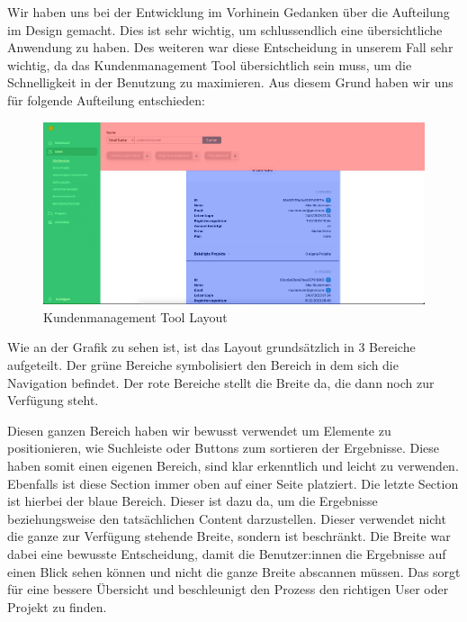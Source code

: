 Wir haben uns bei der Entwicklung im Vorhinein Gedanken über die Aufteilung im Design gemacht. Dies ist sehr wichtig, um schlussendlich eine übersichtliche Anwendung zu haben. Des weiteren war diese Entscheidung in unserem Fall sehr wichtig, da das Kundenmanagement Tool übersichtlich sein muss, um die Schnelligkeit in der Benutzung zu maximieren.
Aus diesem Grund haben wir uns für folgende Aufteilung entschieden:

\begin{figure}[h!]
    \centering
    \includegraphics[width=1\textwidth]{pics/planfred-grids.png}
    \caption{Kundenmanagement Tool Layout}
    \label{fig:mesh1}
\end{figure}

Wie an der Grafik zu sehen ist, ist das Layout grundsätzlich in 3 Bereiche aufgeteilt. Der grüne Bereiche symbolisiert den Bereich in dem sich die Navigation befindet. Der rote Bereiche stellt die Breite da, die dann noch zur Verfügung steht.

Diesen ganzen Bereich haben wir bewusst verwendet um Elemente zu positionieren, wie Suchleiste oder Buttons zum sortieren der Ergebnisse. Diese haben somit einen eigenen Bereich, sind klar erkenntlich und leicht zu verwenden. Ebenfalls ist diese Section immer oben auf einer Seite platziert.
\newpage
Die letzte Section ist hierbei der blaue Bereich. Dieser ist dazu da, um die Ergebnisse beziehungsweise den tatsächlichen Content darzustellen. Dieser verwendet nicht die ganze zur Verfügung stehende Breite, sondern ist beschränkt. Die Breite war dabei eine bewusste Entscheidung, damit die Benutzer:innen die Ergebnisse auf einen Blick sehen können und nicht die ganze Breite abscannen müssen. Das sorgt für eine bessere Übersicht und beschleunigt den Prozess den richtigen User oder Projekt zu finden.

